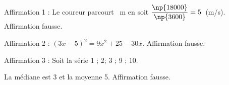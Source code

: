 
\medskip
 
%
%
 
Affirmation 1 : %
Le coureur parcourt ~m en  soit $\dfrac{\np{18000}}{\np{3600}} = 5$~(m/s). Affirmation fausse.

Affirmation 2 : %
 $(3x - 5)^2 = 9x^2 + 25 - 30x $. Affirmation fausse.
 
Affirmation 3 : %
Soit la série 1 ; 2; 3 ; 9 ; 10.

La médiane est 3 et la moyenne 5. Affirmation fausse.
\bigskip  

